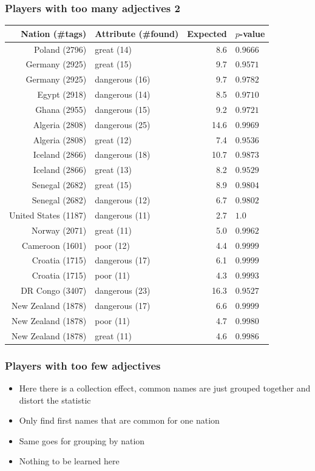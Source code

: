 \documentclass{beamer}
\begin{document}
\begin{frame}
\frametitle{Players with too many adjectives 2}
\scriptsize%
\begin{tabular}{r l r l}
Nation (\#tags) & Attribute (\#found) & Expected & $p$-value\\\hline
Poland (2796) & great (14) & 8.6 & $0.9666$\\
 Germany (2925) & great (15) & 9.7 & $0.9571$\\
 Germany (2925) & dangerous (16) & 9.7 & $0.9782$\\
 Egypt (2918) & dangerous (14) & 8.5 & $0.9710$\\
 Ghana (2955) & dangerous (15) & 9.2 & $0.9721$\\
 Algeria (2808) & dangerous (25) & 14.6 & $0.9969$\\
 Algeria (2808) & great (12) & 7.4 & $0.9536$\\
 Iceland (2866) & dangerous (18) & 10.7 & $0.9873$\\
 Iceland (2866) & great (13) & 8.2 & $0.9529$\\
 Senegal (2682) & great (15) & 8.9 & $0.9804$\\
 Senegal (2682) & dangerous (12) & 6.7 & $0.9802$\\
 {\color{gray}United States (1187)} & {\color{gray}dangerous (11)} & {\color{gray}2.7} & {\color{gray}$1.0$}\\
 Norway (2071) & great (11) & 5.0 & $0.9962$\\
 Cameroon (1601) & poor (12) & 4.4 & $0.9999$\\
 Croatia (1715) & dangerous (17) & 6.1 & $0.9999$\\
 Croatia (1715) & poor (11) & 4.3 & $0.9993$\\
 DR Congo (3407) & dangerous (23) & 16.3 & $0.9527$\\
 New Zealand (1878) & dangerous (17) & 6.6 & $0.9999$\\
 New Zealand (1878) & poor (11) & 4.7 & $0.9980$\\
 New Zealand (1878) & great (11) & 4.6 & $0.9986$\\\hline
 \end{tabular}
 \end{frame}
 
 \begin{frame}
 \frametitle{Players with too few adjectives}
 \begin{itemize}
 \item Here there is a collection effect, common names are just grouped together and distort the statistic
 \item Only find first names that are common for one nation
 \item Same goes for grouping by nation
 \item Nothing to be learned here
 \end{itemize}
 \end{frame}
 
\end{document}
